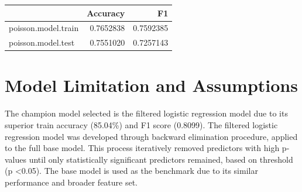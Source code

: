 \documentclass[
  letterpaper,
  DIV=11,
  numbers=noendperiod]{scrartcl}
\newenvironment{Shaded}{\begin{snugshade}}{\end{snugshade}}
\newcommand{\AttributeTok}[1]{\textcolor[rgb]{0.40,0.45,0.13}{#1}}
\newcommand{\FunctionTok}[1]{\textcolor[rgb]{0.28,0.35,0.67}{#1}}
\newcommand{\NormalTok}[1]{\textcolor[rgb]{0.00,0.23,0.31}{#1}}
\newcommand{\OtherTok}[1]{\textcolor[rgb]{0.00,0.23,0.31}{#1}}
\newcommand{\SpecialCharTok}[1]{\textcolor[rgb]{0.37,0.37,0.37}{#1}}
\newcommand{\StringTok}[1]{\textcolor[rgb]{0.13,0.47,0.30}{#1}}
\begin{document}
\begin{Shaded}
\end{Shaded}

\begin{longtable}[]{@{}lrr@{}}
\toprule\noalign{}
& Accuracy & F1 \\
\midrule\noalign{}
\endhead
\bottomrule\noalign{}
\endlastfoot
poisson.model.train & 0.7652838 & 0.7592385 \\
poisson.model.test & 0.7551020 & 0.7257143 \\
\end{longtable}

\section{Model Limitation and
Assumptions}\label{model-limitation-and-assumptions}

The champion model selected is the filtered logistic regression model
due to its superior train accuracy (85.04\%) and F1 score (0.8099). The
filtered logistic regression model was developed through backward
elimination procedure, applied to the full base model. This process
iteratively removed predictors with high p-values until only
statistically significant predictors remained, based on threshold (p
\textless0.05). The base model is used as the benchmark due to its
similar performance and broader feature set.
\end{document}
